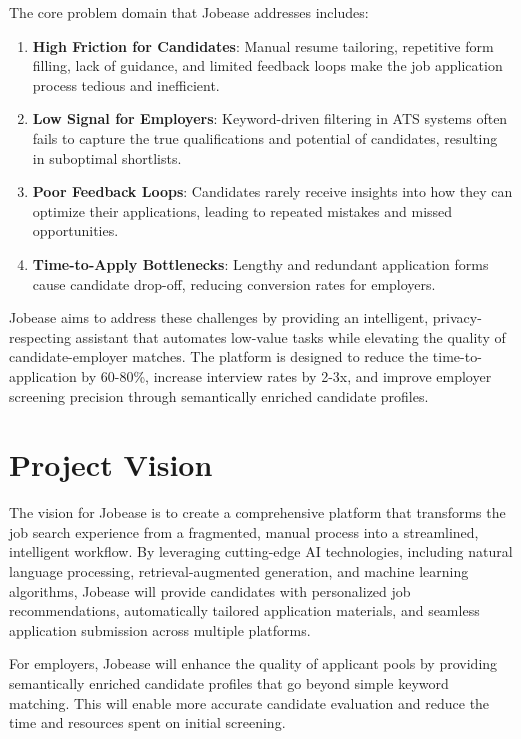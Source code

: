\documentclass[12pt,a4paper]{report}
\begin{document}
The core problem domain that Jobease addresses includes:

\begin{enumerate}
    \item \textbf{High Friction for Candidates}: Manual resume tailoring, repetitive form filling, lack of guidance, and limited feedback loops make the job application process tedious and inefficient.
    \item \textbf{Low Signal for Employers}: Keyword-driven filtering in ATS systems often fails to capture the true qualifications and potential of candidates, resulting in suboptimal shortlists.
    \item \textbf{Poor Feedback Loops}: Candidates rarely receive insights into how they can optimize their applications, leading to repeated mistakes and missed opportunities.
    \item \textbf{Time-to-Apply Bottlenecks}: Lengthy and redundant application forms cause candidate drop-off, reducing conversion rates for employers.
\end{enumerate}

Jobease aims to address these challenges by providing an intelligent, privacy-respecting assistant that automates low-value tasks while elevating the quality of candidate-employer matches. The platform is designed to reduce the time-to-application by 60-80\%, increase interview rates by 2-3x, and improve employer screening precision through semantically enriched candidate profiles.

\section*{Project Vision}

The vision for Jobease is to create a comprehensive platform that transforms the job search experience from a fragmented, manual process into a streamlined, intelligent workflow. By leveraging cutting-edge AI technologies, including natural language processing, retrieval-augmented generation, and machine learning algorithms, Jobease will provide candidates with personalized job recommendations, automatically tailored application materials, and seamless application submission across multiple platforms.

For employers, Jobease will enhance the quality of applicant pools by providing semantically enriched candidate profiles that go beyond simple keyword matching. This will enable more accurate candidate evaluation and reduce the time and resources spent on initial screening.
\end{document}
